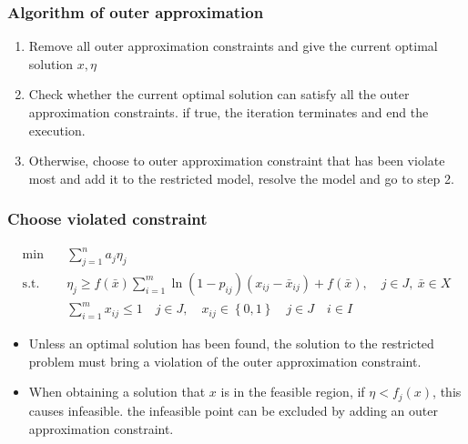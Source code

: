 \documentclass[CJK,10pt]{beamer}
\begin{document}
\begin{frame}
    \frametitle{Algorithm of outer approximation}
    \begin{enumerate}
        \item Remove all outer approximation constraints and give the current optimal solution $x, \eta$
        \item Check whether the current optimal solution can satisfy all the outer approximation constraints. if true, the iteration terminates and end the execution.
        \item Otherwise, choose to outer approximation constraint that has been violate most and add it to the restricted model, resolve the model and go to step 2.
    \end{enumerate}
\end{frame}


\begin{frame}
    \frametitle{Choose violated constraint}
    {
    \scriptsize
    \begin{align*}
        \min\quad & \sum_{j=1}^n a_j \eta_j \\ 
        \mathrm{s. t.}\quad & \eta_j \geq f(\bar{x})\sum_{i = 1}^m \ln(1-p_{ij})(x_{ij} - \bar{x}_{ij}) + f(\bar{x}), \quad j \in J,\ \bar{x} \in X \\ 
        &\sum_{i=1}^m x_{ij} \leq 1\quad j \in J,\quad x_{ij} \in \left\{ 0,1 \right\} \quad j\in J\quad i \in I
    \end{align*}
    }
    \begin{itemize}
        \item Unless an optimal solution has been found, the solution to the restricted problem must bring a violation of the outer approximation constraint.
        \item When obtaining a solution that $x$ is in the feasible region, if $\eta < f_j(x)$, this causes infeasible. the infeasible point can be excluded by adding an outer approximation constraint.
    \end{itemize}
\end{frame}
\end{document}
